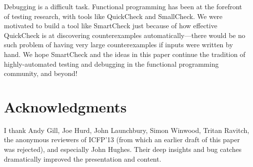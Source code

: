 \documentclass{sigplanconf}
\begin{document}


Debugging is a difficult task.  Functional programming has been at the forefront
of testing research, with tools like QuickCheck and SmallCheck.  We were
motivated to build a tool like SmartCheck just because of how effective
QuickCheck is at discovering counterexamples automatically---there would be no
such problem of having very large counterexamples if inputs were written by
hand.  We hope SmartCheck and the ideas in this paper continue the tradition of
highly-automated testing and debugging in the functional programming community,
and beyond!



\section*{Acknowledgments}
I thank Andy Gill, Joe Hurd, John Launchbury, Simon Winwood, Tritan Ravitch, the
anonymous reviewers of ICFP'13 (from which an earlier draft of this paper was
rejected), and especially John Hughes.  Their deep insights and bug catches
dramatically improved the presentation and content.




\balancecolumns
\end{document}
